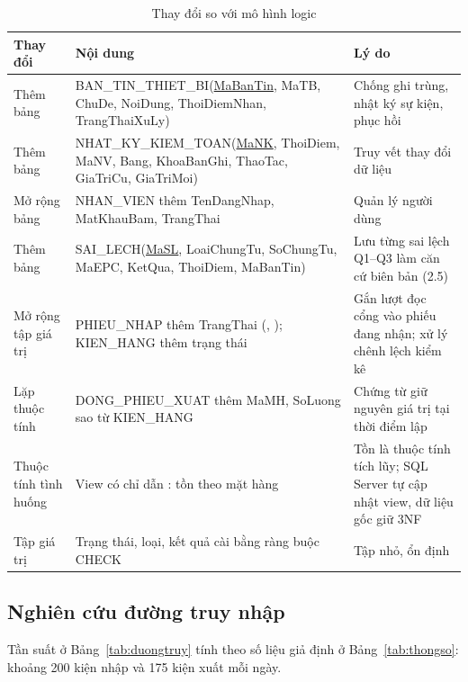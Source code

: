 \begin{table}[H]
\centering
\caption{Thay đổi so với mô hình logic}
\label{tab:thaydoi}
\small
\begin{tabularx}{\textwidth}{L{2.6cm} Y L{4.6cm}}
\toprule
\textbf{Thay đổi} & \textbf{Nội dung} & \textbf{Lý do} \\
\midrule
Thêm bảng & BAN\_TIN\_THIET\_BI(\underline{MaBanTin}, MaTB, ChuDe, NoiDung, ThoiDiemNhan, TrangThaiXuLy) & Chống ghi trùng, nhật ký sự kiện, phục hồi \\
Thêm bảng & NHAT\_KY\_KIEM\_TOAN(\underline{MaNK}, ThoiDiem, MaNV, Bang, KhoaBanGhi, ThaoTac, GiaTriCu, GiaTriMoi) & Truy vết thay đổi dữ liệu \\
Mở rộng bảng & NHAN\_VIEN thêm TenDangNhap, MatKhauBam, TrangThai & Quản lý người dùng \\
Thêm bảng & SAI\_LECH(\underline{MaSL}, LoaiChungTu, SoChungTu, MaEPC, KetQua, ThoiDiem, MaBanTin) & Lưu từng sai lệch Q1--Q3 làm căn cứ biên bản (2.5) \\
Mở rộng tập giá trị & PHIEU\_NHAP thêm TrangThai (, ); KIEN\_HANG thêm trạng thái  & Gắn lượt đọc cổng vào phiếu đang nhận; xử lý chênh lệch kiểm kê \\
Lặp thuộc tính & DONG\_PHIEU\_XUAT thêm MaMH, SoLuong sao từ KIEN\_HANG & Chứng từ giữ nguyên giá trị tại thời điểm lập \\
Thuộc tính tình huống & View có chỉ dẫn : tồn theo mặt hàng & Tồn là thuộc tính tích lũy; SQL Server tự cập nhật view, dữ liệu gốc giữ 3NF \\
Tập giá trị & Trạng thái, loại, kết quả cài bằng ràng buộc CHECK & Tập nhỏ, ổn định \\
\bottomrule
\end{tabularx}
\end{table}

\subsection{Nghiên cứu đường truy nhập}

Tần suất ở Bảng~\ref{tab:duongtruy} tính theo số liệu giả định ở Bảng~\ref{tab:thongso}: khoảng 200 kiện nhập và 175 kiện xuất mỗi ngày.

